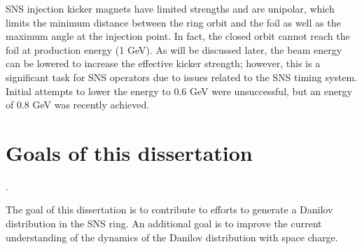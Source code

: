 SNS injection kicker magnets have limited strengths and are unipolar, which limits the minimum distance between the ring orbit and the foil as well as the maximum angle at the injection point. In fact, the closed orbit cannot reach the foil at production energy (1 GeV). As will be discussed later, the beam energy can be lowered to increase the effective kicker strength; however, this is a significant task for SNS operators due to issues related to the SNS timing system. Initial attempts to lower the energy to 0.6 GeV were unsuccessful, but an energy of 0.8 GeV was recently achieved. 



\section{Goals of this dissertation}\label{sec:Goals of this dissertation}.

The goal of this dissertation is to contribute to efforts to generate a Danilov distribution in the SNS ring. An additional goal is to improve the current understanding of the dynamics of the Danilov distribution with space charge.

